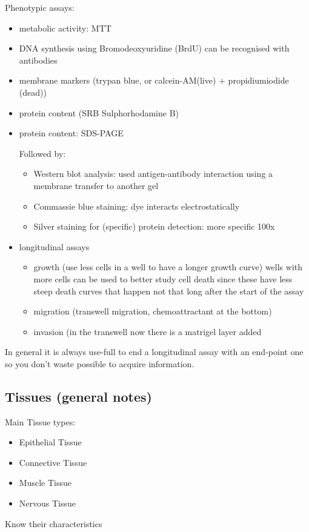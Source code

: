 \documentclass{article}
\begin{document}
Phenotypic assays:
\begin{itemize}
    \item metabolic activity: MTT
    \item DNA synthesis using Bromodeoxyuridine (BrdU) can be recognised with antibodies
    \item membrane markers (trypan blue, or calcein-AM(live) + propidiumiodide (dead))
    \item protein content (SRB Sulphorhodamine B)  
    \item protein content: SDS-PAGE
    
    
    Followed by:
    \begin{itemize}
        \item Western blot analysis: used antigen-antibody interaction using a membrane transfer to another gel
        \item Commassie blue staining: dye interacts electrostatically
        \item Silver staining for (specific) protein detection: more specific 100x
    \end{itemize}
    \item longitudinal assays 
    \begin{itemize}
        \item growth (use less cells in a well to have a longer growth curve) wells with more cells can be used to better study cell death since these have less steep death curves that happen not that long after the start of the assay
        \item migration (transwell migration, chemoattractant at the bottom)
        \item invasion (in the transwell now there is a matrigel layer added
    \end{itemize}
\end{itemize}

In general it is always use-full to end a longitudinal assay with an end-point one so you don't waste possible to acquire information.

\subsection{Tissues (general notes)}
Main Tissue types:
\begin{itemize}
    \item Epithelial Tissue
    
    \item Connective Tissue
    
    \item Muscle Tissue
    
    \item Nervous Tissue
    
\end{itemize}
Know their characteristics
\end{document}
